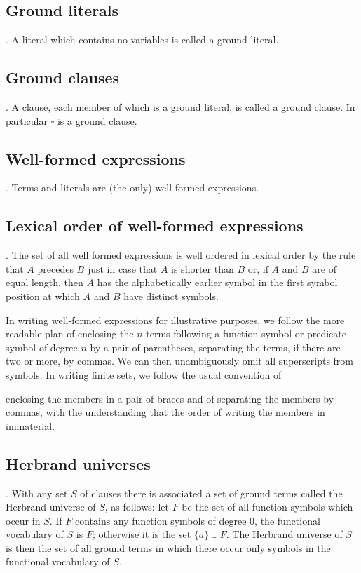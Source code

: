 \documentclass[8pt]{extarticle}
\begin{document}
\subsection{Ground literals}. A literal which contains no variables is called a ground literal.

\subsection{Ground clauses}. A clause, each member of which is a ground literal, is called a ground clause. In particular $\square$ is a ground clause.

\subsection{Well-formed expressions}. Terms and literals are (the only) well formed expressions.

\subsection{Lexical order of well-formed expressions}. The set of all well formed expressions is well ordered in lexical order by the rule that $A$ precedes $B$ just in case that $A$ is shorter than $B$ or, if $A$ and $B$ are of equal length, then $A$ has the alphabetically earlier symbol in the first symbol position at which $A$ and $B$ have distinct symbols.

In writing well-formed expressions for illustrative purposes, we follow the more readable plan of enclosing the $n$ terms following a function symbol or predicate symbol of degree $n$ by a pair of parentheses, separating the terms, if there are two or more, by commas. We can then unambiguously omit all superscripts from symbols. In writing finite sets, we follow the usual convention of

\newpage
\noindent enclosing the members in a pair of braces and of separating the members by commas, with the understanding that the order of writing the members in immaterial.

\subsection{Herbrand universes}. With any set $S$ of clauses there is associated a set of ground terms called the Herbrand universe of $S$, as follows: let $F$ be the set of all function symbols which occur in $S$. If $F$ contains any function symbols of degree 0, the functional vocabulary of $S$ is $F$; otherwise it is the set $\{a\}\cup F$. The Herbrand universe of $S$ is then the set of all ground terms in which there occur only symbols in the functional vocabulary of $S$.
\end{document}
